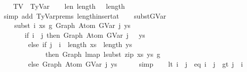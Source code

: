 \begin{isabellebody}
\ \ \isamarkupfalse%
\ TV\ {\isacharequal}{\kern0pt}\ TyVar\isanewline
\isanewline
\ \ \isamarkupfalse%
\ len{\isacharunderscore}{\kern0pt}{\isasymGamma}{}{\isacharcolon}{\kern0pt}\ {\isachardoublequoteopen}length\ {\isasymGamma}\ {\isacharequal}{\kern0pt}\ length\ {\isasymGamma}{}\ {\isacharplus}{\kern0pt}\ {}{\isachardoublequoteclose}\isanewline
\ \ \ \ \ \isamarkupfalse%
\ {\isacharparenleft}{\kern0pt}simp\ add{\isacharcolon}{\kern0pt}\ TyVar{\isachardot}{\kern0pt}prems{\isacharparenleft}{\kern0pt}{}{\isacharparenright}{\kern0pt}\ length{\isacharunderscore}{\kern0pt}insert{\isacharunderscore}{\kern0pt}at{\isacharparenright}{\kern0pt}\isanewline
\isanewline
\ \ \isamarkupfalse%
\ subst{\isacharunderscore}{\kern0pt}GVar{\isacharcolon}{\kern0pt}\isanewline
\ \ \ \ {\isachardoublequoteopen}subst\ i\ xs\ g{}\ {\isacharparenleft}{\kern0pt}Graph\ {\isacharparenleft}{\kern0pt}Atom\ {\isacharparenleft}{\kern0pt}GVar\ j{\isacharparenright}{\kern0pt}\ ys{\isacharparenright}{\kern0pt}{\isacharparenright}{\kern0pt}\ {\isacharequal}{\kern0pt}\isanewline
\ \ \ \ \ \ \ {\isacharparenleft}{\kern0pt}if\ i\ {\isacharless}{\kern0pt}\ j\ then\ Graph\ {\isacharparenleft}{\kern0pt}Atom\ {\isacharparenleft}{\kern0pt}GVar\ {\isacharparenleft}{\kern0pt}j\ {\isacharminus}{\kern0pt}\ {}{\isacharparenright}{\kern0pt}{\isacharparenright}{\kern0pt}\ ys{\isacharparenright}{\kern0pt}\isanewline
\ \ \ \ \ \ \ \ else\ if\ j\ {\isacharequal}{\kern0pt}\ i\ {\isasymand}\ length\ xs\ {\isacharequal}{\kern0pt}\ length\ ys\isanewline
\ \ \ \ \ \ \ \ \ \ \ \ \ then\ Graph\ {\isacharparenleft}{\kern0pt}lmap\ {\isacharparenleft}{\kern0pt}lsubst\ {\isacharparenleft}{\kern0pt}zip\ xs\ ys{\isacharparenright}{\kern0pt}{\isacharparenright}{\kern0pt}\ g{}{\isacharparenright}{\kern0pt}\isanewline
\ \ \ \ \ \ \ \ else\ Graph\ {\isacharparenleft}{\kern0pt}Atom\ {\isacharparenleft}{\kern0pt}GVar\ j{\isacharparenright}{\kern0pt}\ ys{\isacharparenright}{\kern0pt}{\isacharparenright}{\kern0pt}{\isachardoublequoteclose}\isanewline
\ \ \ \ \isamarkupfalse%
\ simp\isanewline
\isanewline
\ \ \isamarkupfalse%
\ {\isacharparenleft}{\kern0pt}lt{\isacharparenright}{\kern0pt}\ {\isachardoublequoteopen}i\ {\isacharless}{\kern0pt}\ j{\isachardoublequoteclose}\ {\isacharbar}{\kern0pt}\ {\isacharparenleft}{\kern0pt}eq{\isacharparenright}{\kern0pt}\ {\isachardoublequoteopen}i\ {\isacharequal}{\kern0pt}\ j{\isachardoublequoteclose}\ {\isacharbar}{\kern0pt}\ {\isacharparenleft}{\kern0pt}gt{\isacharparenright}{\kern0pt}\ {\isachardoublequoteopen}j\ {\isacharless}{\kern0pt}\ i{\isachardoublequoteclose}\isanewline

\end{isabellebody}
